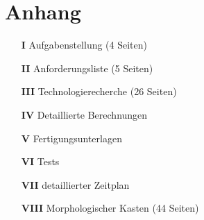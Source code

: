 

\newpage
\section*{Anhang}
\begin{itemize}
  \item[\textbf{I}] Aufgabenstellung (4 Seiten)
  \item[\textbf{II}] Anforderungsliste (5 Seiten)
  \item[\textbf{III}] Technologierecherche (26 Seiten)
  \item[\textbf{IV}] Detaillierte Berechnungen
  \item[\textbf{V}] Fertigungsunterlagen
  \item[\textbf{VI}] Tests
 \item[\textbf{VII}]  detaillierter Zeitplan

  \item[\textbf{VIII}] Morphologischer Kasten (44 Seiten)
\end{itemize}
 
%
%
%
%



